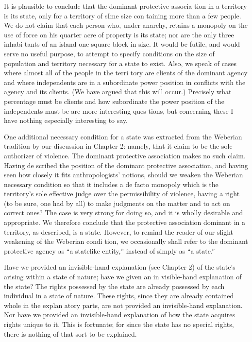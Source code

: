 \documentclass[11pt,openany]{book}
\begin{document}
It is plausible to conclude that the dominant protective associa tion in a territory is its state, only for a territory of sIme size con taining more than a few people. We do not claim that each person who, under anarchy, retains a monopoly on the use of force on his quarter acre of property is its state; nor are the only three inhabi tants of an island one square block in size. It would be futile, and would serve no useful purpose, to attempt to specify conditions on the size of population and territory necessary for a state to exist. Also, we speak of cases where almost all of the people in the terri tory are clients of the dominant agency and where independents are in a subordinate power position in conflicts with the agency and its clients. (We have argued that this will occur.) Precisely what percentage must be clients and how subordinate the power position of the independents must be are more interesting ques tions, but concerning these I have nothing especially interesting to say. 

One additional necessary condition for a state was extracted from the Weberian tradition by our discussion in Chapter 2: namely, that it claim to be the sole authorizer of violence. The dominant protective association makes no such claim. Having de scribed the position of the dominant protective association, and having seen how closely it fits anthropologists' notions, should we weaken the Weberian necessary condition so that it includes a de facto monopoly which is the territory's sole effective judge over the permissibility of violence, having a right (to be sure, one had by all) to make judgments on the matter and to act on correct ones? The case is very strong for doing so, and it is wholly desirable and appropriate. We therefore conclude that the protective association dominant in a territory, as described, is a state. However, to remind the reader of our slight weakening of the Weberian condi tion, we occasionally shall refer to the dominant protective agency as ``a statelike entity,'' instead of simply as ``a state.'' 

Have we provided an invisible-hand explanation (see Chapter 2) of the state's arising within a state of nature; have we given an in visible-hand explanation of the state? The rights possessed by the state are already possessed by each individual in a state of nature. These rights, since they are already contained whole in the explan atory parts, are not provided an invisible-hand explanation. Nor have we provided an invisible-hand explanation of how the state acquires rights unique to it. This is fortunate; for since the state has no special rights, there is nothing of that sort to be explained. 
\end{document}

